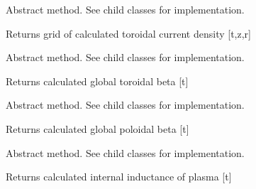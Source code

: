 \documentclass[letterpaper,10pt,english]{sphinxmanual}
\begin{document}
\begin{fulllineitems}
\begin{fulllineitems}
\end{fulllineitems}


\begin{fulllineitems}
\label{\detokenize{eqtools:eqtools.core.Equilibrium.getJp}}
Abstract method.  See child classes for implementation.

Returns grid of calculated toroidal current density {[}t,z,r{]}

\end{fulllineitems}


\begin{fulllineitems}
\label{\detokenize{eqtools:eqtools.core.Equilibrium.getBetaT}}
Abstract method.  See child classes for implementation.

Returns calculated global toroidal beta {[}t{]}

\end{fulllineitems}


\begin{fulllineitems}
\label{\detokenize{eqtools:eqtools.core.Equilibrium.getBetaP}}
Abstract method.  See child classes for implementation.

Returns calculated global poloidal beta {[}t{]}

\end{fulllineitems}


\begin{fulllineitems}
\label{\detokenize{eqtools:eqtools.core.Equilibrium.getLi}}
Abstract method.  See child classes for implementation.

Returns calculated internal inductance of plasma {[}t{]}


\end{fulllineitems}
\end{fulllineitems}
\end{document}

